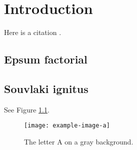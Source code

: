\chapter{Introduction}

Here is a citation \cite{doe2099paper}.

\section{Epsum factorial}

\lipsum[1-2]

\section{Souvlaki ignitus}

\lipsum[3] See Figure \ref{fig:a}.

\begin{figure}
    \centering
    \texttt{[image: example-image-a]}
    \caption{The letter A on a gray background.}
    \label{fig:a}
\end{figure}

